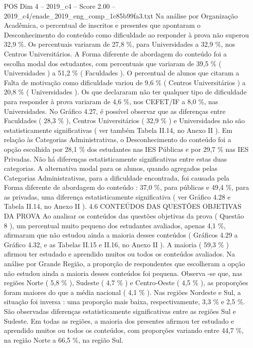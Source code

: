 \begin{textsample}{POS Dim 4 – 2019\_c4 – Score 2.00 – 2019\_c4/enade\_2019\_eng\_comp\_1c85b99fa3.txt}
Na análise por Organização Acadêmica, o percentual de inscritos e presentes que apontaram o Desconhecimento do conteúdo como dificuldade ao responder à prova não superou 32,9 \%.
Os percentuais variaram de 27,8 \%, para Universidades a 32,9 \%, nos Centros Universitários.
A Forma diferente de abordagem do conteúdo foi a escolha modal dos estudantes, com percentuais que variaram de 39,5 \% ( Universidades ) a 51,2 \% ( Faculdades ).
O percentual de alunos que citaram a Falta de motivação como dificuldade variou de 9,6 \% ( Centros Universitários ) a 20,8 \% ( Universidades ).
Os que declararam não ter qualquer tipo de dificuldade para responder à prova variaram de 4,6 \%, nos CEFET/IF a 8,0 \%, nas Universidades.
No Gráfico 4.27, é possível observar que as diferenças entre Faculdades ( 28,3 \% ), Centros Universitários ( 32,9 \% ) e Universidades não são estatisticamente significativas ( ver também Tabela II.14, no Anexo II ).
Em relação às Categorias Administrativas, o Desconhecimento do conteúdo foi a opção escolhida por 28,1 \% dos estudantes nas IES Públicas e por 29,7 \% nas IES Privadas.
Não há diferenças estatisticamente significativas entre estas duas categorias.
A alternativa modal para os alunos, quando agregados pelas Categorias Administrativas, para a dificuldade encontrada, foi causada pela Forma diferente de abordagem do conteúdo : 37,0 \%, para públicas e 49,4 \%, para as privadas, uma diferença estatisticamente significativa ( ver Gráfico 4.28 e Tabela II.14, no Anexo II ). 4.6 CONTEÚDOS DAS QUESTÕES OBJETIVAS DA PROVA Ao analisar os conteúdos das questões objetivas da prova ( Questão 8 ), um percentual muito pequeno dos estudantes avaliados, apenas 4,1 \%, afirmaram que não estudou ainda a maioria desses conteúdos ( Gráficos 4.29 a Gráfico 4.32, e as Tabelas II.15 e II.16, no Anexo II ).
A maioria ( 59,3 \% ) afirmou ter estudado e aprendido muitos ou todos os conteúdos avaliados.
Na análise por Grande Região, a proporção de respondentes que escolheram a opção não estudou ainda a maioria desses conteúdos foi pequena.
Observa -se que, nas regiões Norte ( 5,8 \% ), Sudeste ( 4,7 \% ) e Centro-Oeste ( 4,5 \% ), as proporções foram maiores do que a média nacional ( 4,1 \% ).
Nas regiões Nordeste e Sul, a situação foi inversa : uma proporção mais baixa, respectivamente, 3,3 \% e 2,5 \%.
São observadas diferenças estatisticamente significativas entre as regiões Sul e Sudeste.
Em todas as regiões, a maioria dos presentes afirmou ter estudado e aprendido muitos ou todos os conteúdos, com proporções variando entre 44,7 \%, na região Norte a 66,5 \%, na região Sul.

\end{textsample}
